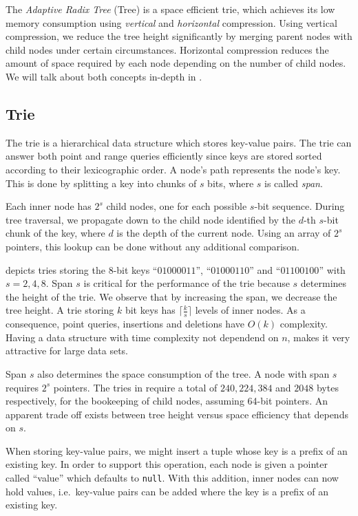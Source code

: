 \documentclass[abstracton,12pt]{scrartcl}
\theoremstyle{definition}
\begin{document}
The \textit{Adaptive Radix Tree} (Tree) is a space efficient trie, which
achieves its low memory consumption using \textit{vertical} and 
\textit{horizontal} compression. Using vertical compression, we reduce
the tree height significantly by merging parent nodes with child nodes
under certain circumstances. Horizontal compression reduces the amount
of space required by each node depending on the number of child nodes.
We will talk about both concepts in-depth
in .

\subsection{Trie}
\label{sec:trie}

The trie \cite{fredkin1960trie} is a hierarchical data structure which
stores key-value pairs. The trie can answer both point and range queries 
efficiently since keys are stored sorted according to their lexicographic order.
A node's path represents the node's key. This is done by splitting a key into
chunks of $s$ bits, where $s$ is called \textit{span}. 

Each inner node has 
$2^s$ child nodes, one for each possible $s$-bit sequence. During tree
traversal, we propagate down to the child node identified by the $d$-th
$s$-bit chunk of the key, where $d$ is the depth of the current node. 
Using an array of $2^s$  pointers, this lookup can be done without any 
additional comparison. 

 depicts tries storing the 
8-bit keys ``$01000011$'', ``$01000110$'' and ``$01100100$'' with 
$s=2, 4, 8$. Span $s$ is critical for the performance of the trie because $s$ 
determines the height of the trie. We observe that by increasing the span, 
we decrease the tree height. A trie
storing $k$ bit keys has $\lceil \frac{k}{s} \rceil$ levels of inner nodes.
As a consequence, point queries, insertions and deletions have 
$O(k)$ complexity. Having a data structure with
time complexity not dependend on $n$, makes it very attractive for large
data sets.

Span $s$ also determines the space consumption of the tree.
A node with span $s$ requires $2^s$ pointers. The tries in 
 require a total of $240, 224, 384$ and $2048$ bytes 
respectively, for the bookeeping of child nodes, assuming 64-bit pointers.
An apparent trade off exists between tree height versus space efficiency that
depends on $s$.

When storing key-value pairs, we might insert a tuple whose key is a prefix
of an existing key. In order to support this operation, each node is given a
pointer called ``value'' which defaults to \texttt{null}. With this addition,
inner nodes can now hold values, i.e.\ key-value pairs can be added where
the key is a prefix of an existing key.
\end{document}
